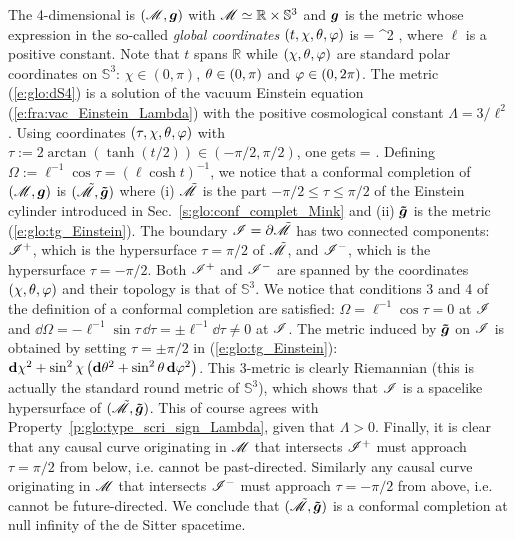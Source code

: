 \begin{example}
The 4-dimensional  is
$(\mathscr{M},\bm{g})$ with $\mathscr{M}\simeq \mathbb{R}\times\mathbb{S}^3$ and $\bm{g}$ is the metric
whose expression in the so-called \emph{global coordinates}
$(t,\chi,\theta,\varphi)$ is
\be \label{e:glo:dS4}
     = \ell^2  ,
\ee
where $\ell$ is a positive constant. Note that $t$ spans $\mathbb{R}$
while $(\chi,\theta,\varphi)$ are standard polar coordinates on $\mathbb{S}^3$:
$\chi\in(0,\pi)$, $\theta\in(0,\pi)$ and $\varphi\in(0,2\pi)$.
 The metric (\ref{e:glo:dS4}) is a solution
of the vacuum Einstein equation (\ref{e:fra:vac_Einstein_Lambda}) with
the positive cosmological constant $\Lambda = 3/\ell^2$.
Using coordinates $(\tau,\chi,\theta,\varphi)$ with
$\tau := 2\arctan(\tanh(t/2)) \in (-\pi/2,\pi/2)$, one gets
\be
     =   .
\ee
Defining $\Omega := \ell^{-1}\cos\tau = (\ell\cosh t)^{-1}$, we notice that
a conformal completion of $(\mathscr{M},\bm{g})$ is $(\tilde{\mathscr{M}},\bm{\tilde{g}})$
where (i) $\tilde{\mathscr{M}}$ is the part $-\pi/2\leq \tau \leq \pi/2$ of the Einstein cylinder
introduced in Sec.~\ref{s:glo:conf_complet_Mink}
and (ii)  $\bm{\tilde{g}}$ is the metric (\ref{e:glo:tg_Einstein}).
The boundary $\mathscr{I} = \partial\tilde{\mathscr{M}}$ has two connected components:
$\mathscr{I}^+$, which is the hypersurface $\tau = \pi/2$ of $\tilde{\mathscr{M}}$, and
$\mathscr{I}^-$, which is the hypersurface $\tau = -\pi/2$.
Both $\mathscr{I}^+$ and $\mathscr{I}^-$ are spanned by the coordinates $(\chi,\theta,\varphi)$
and their topology is that of $\mathbb{S}^3$.
We notice that conditions 3 and 4 of the definition of a conformal completion
are satisfied: $\Omega = \ell^{-1} \cos\tau = 0$ at $\mathscr{I}$ and
$\dd\Omega = - \ell^{-1} \sin\tau\, \dd\tau = \pm \ell^{-1} \dd\tau \not = 0 $
at $\mathscr{I}$.
The metric induced by $\bm{\tilde{g}}$ on $\mathscr{I}$ is obtained by
setting $\tau=\pm\pi/2$ in (\ref{e:glo:tg_Einstein}):
$\mathbf{d} \chi^2 + \sin^2\chi \left( \mathbf{d}\theta^2 + \sin^2\theta \, \mathbf{d}\varphi^2 \right) $.
This 3-metric is clearly Riemannian (this is actually the standard round metric
of $\mathbb{S}^3$), which shows that $\mathscr{I}$ is a spacelike
hypersurface of $(\tilde{\mathscr{M}},\bm{\tilde{g}})$. This of course agrees with
Property~\ref{p:glo:type_scri_sign_Lambda}, given that $\Lambda > 0$.
Finally, it is clear that
any causal curve originating in $\mathscr{M}$ that intersects $\mathscr{I}^+$ must approach
$\tau=\pi/2$ from below, i.e. cannot be past-directed. Similarly any
causal curve originating in $\mathscr{M}$ that intersects $\mathscr{I}^-$ must approach
$\tau=-\pi/2$ from above, i.e. cannot be future-directed. We conclude
that $(\tilde{\mathscr{M}},\bm{\tilde{g}})$ is a conformal completion at null infinity
of the de Sitter spacetime.
\end{example}

